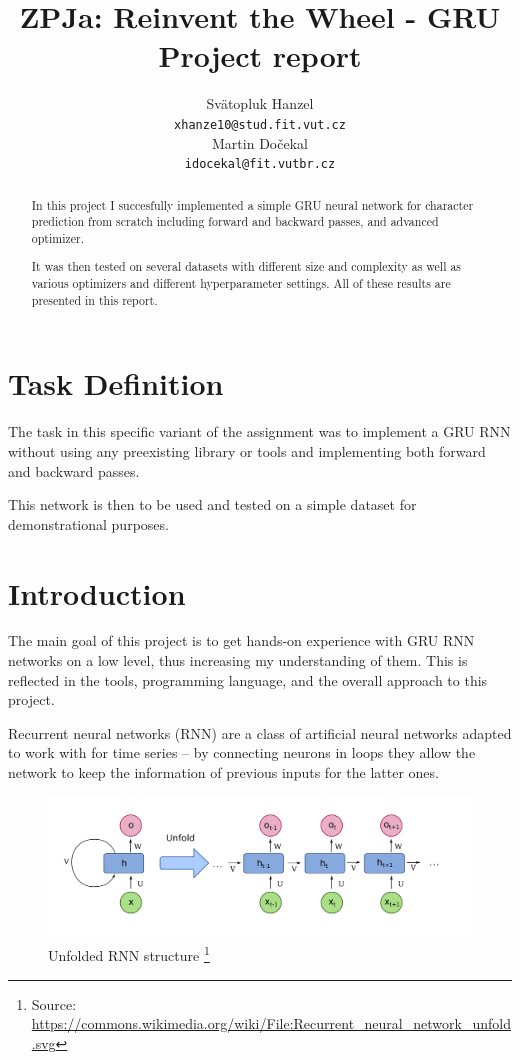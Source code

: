 \documentclass[11pt]{article}
\title{
	ZPJa: Reinvent the Wheel - GRU\\
	\large{Project report}
}
\author{Svätopluk Hanzel \\
  \texttt{xhanze10@stud.fit.vut.cz} \\\And
  Martin Dočekal\\
  \texttt{idocekal@fit.vutbr.cz}
 }
\begin{document}
	\maketitle
	\begin{abstract}
		In this project I succesfully implemented a simple GRU neural network for character prediction from scratch including forward and backward passes, and advanced optimizer.
		
		It was then tested on several datasets with different size and complexity as well as various optimizers and different hyperparameter settings. All of these results are presented in this report.
	\end{abstract}


	\section{Task Definition}
		The task in this specific variant of the assignment was to implement a GRU RNN without using any preexisting library or tools and implementing both forward and backward passes.
		
		This network is then to be used and tested on a simple dataset for demonstrational purposes.
	
	\section{Introduction} \label{sec:introduction}
		The main goal of this project is to get hands-on experience with GRU RNN networks on a low level, thus increasing my understanding of them. This is reflected in the tools, programming language, and the overall approach to this project.
		
		Recurrent neural networks (RNN) are a class of artificial neural networks adapted to work with for time series -- by connecting neurons in loops they allow the network to keep the information of previous inputs for the latter ones.
		
		\begin{figure}[h]
			\centering
			\includegraphics[width=1\linewidth]{img/rnn-unfold}
			\caption{Unfolded RNN structure \footnote{Source: \url{https://commons.wikimedia.org/wiki/File:Recurrent_neural_network_unfold.svg}}}
			\label{fig:rnn-unrolled}
		\end{figure}
	
\end{document}

